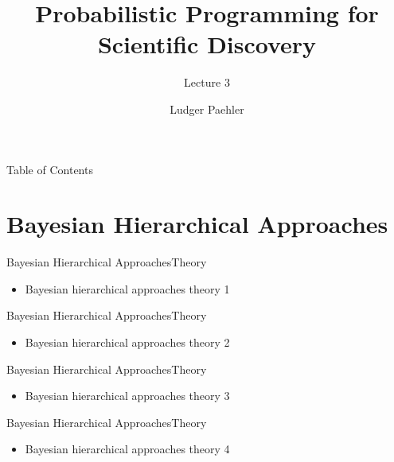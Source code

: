 \documentclass[AERbeamer%
              ,optEnglish%
              ,optBiber%
              ,optBibstyleAlphabetic%
              ,optBeamerClassicFormat%
              ]{AERlatex}%
\title{Probabilistic Programming for Scientific Discovery}%
\subtitle{Lecture 3}
\author{Ludger Paehler}%
\date{\AERutilsDate{29}{7}{2020}}%
\institute{Lviv Data Science Summer School}%
\begin{document}
%
%
\AERbeamerTitlePageDefault%
%
%

\begin{frame}{Table of Contents}{}%
    \tableofcontents
\end{frame}%


\section{Bayesian Hierarchical Approaches}

\begin{frame}[c]{Bayesian Hierarchical Approaches}{Theory}
    \centering
    \begin{itemize}
        \item Bayesian hierarchical approaches theory 1
    \end{itemize}
\end{frame}


\begin{frame}[c]{Bayesian Hierarchical Approaches}{Theory}
    \centering
    \begin{itemize}
        \item Bayesian hierarchical approaches theory 2
    \end{itemize}
\end{frame}


\begin{frame}[c]{Bayesian Hierarchical Approaches}{Theory}
    \centering
    \begin{itemize}
        \item Bayesian hierarchical approaches theory 3
    \end{itemize}
\end{frame}


\begin{frame}[c]{Bayesian Hierarchical Approaches}{Theory}
    \centering
    \begin{itemize}
        \item Bayesian hierarchical approaches theory 4
    \end{itemize}
\end{frame}
\end{document}
